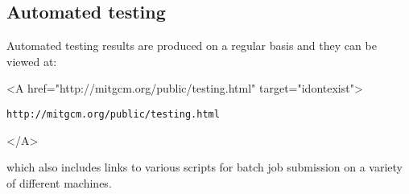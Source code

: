 \subsection{Automated testing}

Automated testing results are produced on a regular basis and they can
be viewed at:
\begin{rawhtml} <A href="http://mitgcm.org/public/testing.html" target="idontexist"> \end{rawhtml}
\begin{verbatim}
http://mitgcm.org/public/testing.html
\end{verbatim}
\begin{rawhtml} </A> \end{rawhtml}
which also includes links to various scripts for batch job submission
on a variety of different machines.

